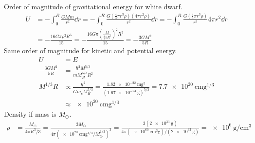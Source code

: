 \documentclass[newpage]{homework}
\begin{document}
\question
Order of magnitude of gravitational energy for white dwarf.
\begin{align*}
    U    &=	- \int_0^R \frac{GMm}{r^2} \dd{r}
    =	- \int_0^R \frac{G(\frac{4}{3}\pi r^3 \rho)(4\pi r^2 \rho)}{r^2} \dd{r}
    =	- \int_0^R \frac{G(\frac{4}{3}\pi r^3 \rho)}{r^2} 4\pi r^2 \dd{r} \\
    &=	- \frac{16G\pi\rho^2 R^5}{15}
    =	- \frac{16G\pi(\frac{M}{\frac{4}{3}\pi R^3})^2 R^5}{15}
    =   \boxed{- \frac{3GM^2}{5R}}
\end{align*}
Same order of magnitude for kinetic and potential energy.
\begin{align*}
    U	&=    E		\\
    - \frac{3GM^2}{5R}	&=  \frac{\hbar^2 M^{5/3}}{mM_H^{5/3} R^2} \\
    M^{1/3} R   &\propto  \frac{\hbar^2}{Gm_e M_H^{5/3}}
    =   \frac{\SI{1.82e-22}{\metre\gram^2}}{(\SI{1.67e-24}{\gram})^{5/3}}
    =   \SI{7.7e20}{\centi\metre\gram^{1/3}}   \\
    &\approx \SI{e20}{\centi\metre \gram^{1/3}}
\end{align*}
Density if mass is $M_\odot$.
\begin{align*}
    \rho	&=  \frac{M_\odot}{4\pi R^3/3}
            =   \frac{3M_\odot}{4\pi (\SI{e20}{\centi\metre\gram^{1/3}}/M_\odot^{1/3})^3}
            =   \frac{3(\SI{2e33}{\gram})}{4\pi (\SI{e60}{\centi\metre^3\gram})/(\SI{2e33}{\gram})}
            =   \boxed{\SI{e6}{\gram/\centi\metre^3}}
\end{align*}
\end{document}
